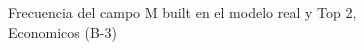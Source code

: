 \begin{figure}[H]
    \centering
    
    \caption{Frecuencia del campo M built en el modelo real y Top 2, Economicos (B-3)}
    \label{frecuency-M Built-top2}
\end{figure}